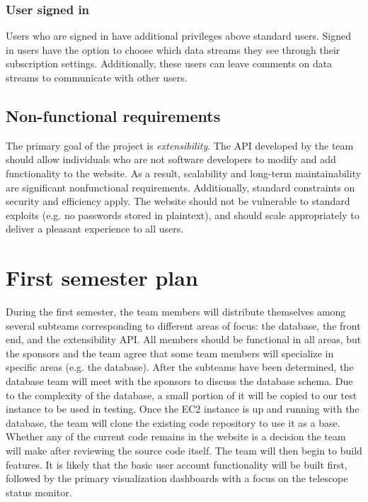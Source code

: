 \documentclass[12pt]{article}
\begin{document}
\begin{spacing}{1.5}
\subsubsection{User signed in}
Users who are signed in have additional privileges above standard users. Signed in users have the option to choose which data streams they see through their subscription settings. Additionally, these users can leave comments on data streams to communicate with other users.

\subsection{Non-functional requirements}
The primary goal of the project is \emph{extensibility}. The API developed by the team should allow individuals who are not software developers to modify and add functionality to the website. As a result, scalability and long-term maintainability are significant nonfunctional requirements. Additionally, standard constraints on security and efficiency apply. The website should not be vulnerable to standard exploits (e.g. no passwords stored in plaintext), and should scale appropriately to deliver a pleasant experience to all users.

\newpage

\section{First semester plan}
During the first semester, the team members will distribute themselves among several subteams corresponding to different areas of focus: the database, the front end, and the extensibility API. All members should be functional in all areas, but the sponsors and the team agree that some team members will specialize in specific areas (e.g. the database). After the subteams have been determined, the database team will meet with the sponsors to discuss the database schema. Due to the complexity of the database, a small portion of it will be copied to our test instance to be used in testing.
\newline \newline
Once the EC2 instance is up and running with the database, the team will clone the existing code repository to use it as a base. Whether any of the current code remains in the website is a decision the team will make after reviewing the source code itself. The team will then begin to build features. It is likely that the basic user account functionality will be built first, followed by the primary visualization dashboards with a focus on the telescope status monitor.


\end{spacing}
\end{document}
